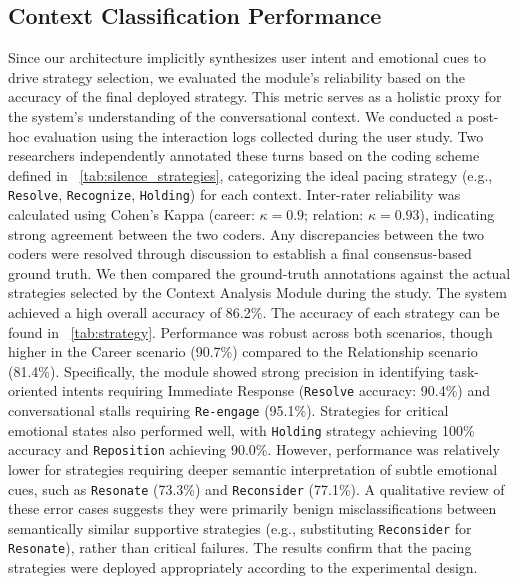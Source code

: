 \subsection{Context Classification Performance}
\label{sec:performance_evaluation} 
Since our architecture implicitly synthesizes user intent and emotional cues to drive strategy selection, we evaluated the module's reliability based on the accuracy of the final deployed strategy. This metric serves as a holistic proxy for the system's understanding of the conversational context. We conducted a post-hoc evaluation using the interaction logs collected during the user study. Two researchers independently annotated these turns based on the coding scheme defined in \tablename{~\ref{tab:silence_strategies}}, categorizing the ideal pacing strategy (e.g., \texttt{Resolve}, \texttt{Recognize}, \texttt{Holding}) for each context. Inter-rater reliability was calculated using Cohen's Kappa (career: $\kappa = 0.9$; relation: $\kappa = 0.93$), indicating strong agreement between the two coders. 
Any discrepancies between the two coders were resolved through discussion to establish a final consensus-based ground truth.
We then compared the ground-truth annotations against the actual strategies selected by the Context Analysis Module during the study. The system achieved a high overall accuracy of 86.2\%. The accuracy of each strategy can be found in \tablename{~\ref{tab:strategy}}.
Performance was robust across both scenarios, though higher in the Career scenario (90.7\%) compared to the Relationship scenario (81.4\%). Specifically, the module showed strong precision in identifying task-oriented intents requiring Immediate Response (\texttt{Resolve} accuracy: 90.4\%) and conversational stalls requiring \texttt{Re-engage} (95.1\%). Strategies for critical emotional states also performed well, with \texttt{Holding} strategy achieving 100\% accuracy and \texttt{Reposition} achieving 90.0\%. However, performance was relatively lower for strategies requiring deeper semantic interpretation of subtle emotional cues, such as \texttt{Resonate} (73.3\%) and \texttt{Reconsider} (77.1\%). A qualitative review of these error cases suggests they were primarily benign misclassifications between semantically similar supportive strategies (e.g., substituting \texttt{Reconsider} for \texttt{Resonate}), rather than critical failures. The results confirm that the pacing strategies were deployed appropriately according to the experimental design.




